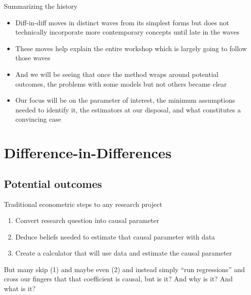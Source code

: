 \documentclass{beamer}
\begin{document}
\begin{frame}{Summarizing the history}

\begin{itemize}

\item Diff-in-diff moves in distinct waves from its simplest forms but does not technically incorporate more contemporary concepts until late in the waves
\item These moves help explain the entire workshop which is largely going to follow those waves
\item And we will be seeing that once the method wraps around potential outcomes, the problems with some models but not others became clear
\item Our focus will be on the parameter of interest, the minimum assumptions needed to identify it, the estimators at our disposal, and what constitutes a convincing case

\end{itemize}

\end{frame}

\section{Difference-in-Differences}


\subsection{Potential outcomes}


\begin{frame}{Traditional econometric steps to any research project}

\begin{enumerate}
\item Convert research question into causal parameter
\item Deduce beliefs needed to estimate that causal parameter with data
\item Create a calculator that will use data and estimate the causal parameter
\end{enumerate}

\bigskip

But many skip (1) and maybe even (2) and instead simply ``run regressions'' and cross our fingers that that coefficient is causal, but is it? And why is it?  And what is it? 

\end{frame}
\end{document}
